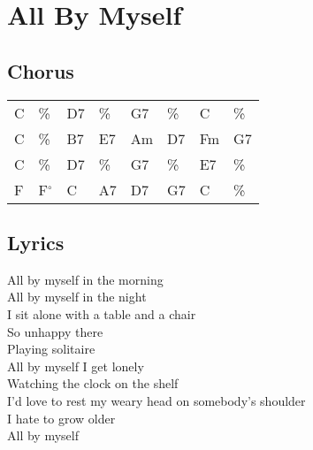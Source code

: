 \section{All By Myself}


\subsection*{Chorus}


\begin{tabular}{l l l l l l l l}
C & \% & D7 & \% & G7 & \% & C & \% \\ 
C & \% & B7 & E7 & Am & D7 & Fm & G7 \\ 
C & \% & D7 & \% & G7 & \% & E7 & \% \\ 
F & F$^{\circ}$ & C & A7 & D7 & G7 & C & \% \\ 
\end{tabular}


\subsection*{Lyrics}


All by myself in the morning \\ 
All by myself in the night \\ 

I sit alone with a table and a chair \\ 
So unhappy there \\ 
Playing solitaire \\ 

All by myself I get lonely \\ 
Watching the clock on the shelf \\ 

I'd love to rest my weary head on somebody's shoulder \\ 
I hate to grow older \\ 
All by myself \\ 
